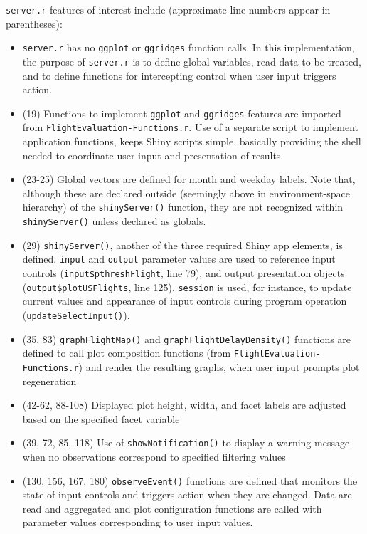 \documentclass[10pt, letterpaper]{article}
\begin{document}
\begin{spacing}{1.0}
\texttt{server.r} features of interest include (approximate line numbers appear in parentheses):

\begin{itemize}  
  \item \texttt{server.r} has no \texttt{ggplot} or \texttt{ggridges} function calls.  In this implementation, the purpose of \texttt{server.r} is to define global variables, read data to be treated, and to define functions for intercepting control when user input triggers action.
  \item (19) Functions to implement \texttt{ggplot} and \texttt{ggridges} features are imported from \texttt{FlightEvaluation-Functions.r}.  Use of a separate script to implement application functions, keeps Shiny scripts simple, basically providing the shell needed to coordinate user input and presentation of results.
  \item (23-25) Global vectors are defined for month and weekday labels.  Note that, although these are declared outside (seemingly above in environment-space hierarchy) of the \texttt{shinyServer()} function, they are not recognized within \texttt{shinyServer()} unless declared as globals.
  \item (29) \texttt{shinyServer()}, another of the three required Shiny app elements, is defined.  \texttt{input} and \texttt{output} parameter values are used to reference input controls (\texttt{input\$pthreshFlight}, line 79), and output presentation objects (\texttt{output\$plotUSFlights}, line 125).  \texttt{session} is used, for instance, to update current values and appearance of input controls during program operation (\texttt{updateSelectInput()}).
  \item (35, 83) \texttt{graphFlightMap()} and \texttt{graphFlightDelayDensity()} functions are defined to call plot composition functions (from \texttt{FlightEvaluation-Functions.r}) and render the resulting graphs, when user input prompts plot regeneration
  \item (42-62, 88-108) Displayed plot height, width, and facet labels are adjusted based on the specified facet variable 
  \item (39, 72, 85, 118) Use of \texttt{showNotification()} to display a warning message when no observations correspond to specified filtering values
  \item (130, 156, 167, 180) \texttt{observeEvent()} functions are defined that monitors the state of input controls and triggers action when they are changed.  Data are read and aggregated and plot configuration functions are called with parameter values corresponding to user input values.

\end{itemize}
\end{spacing}
\end{document}
